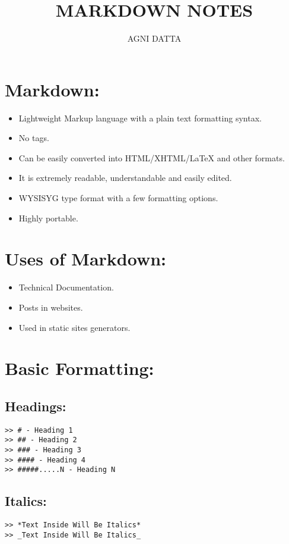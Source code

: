 \documentclass[british]{article}
\begin{document}
\title{\textbf{MARKDOWN NOTES}}
\author{AGNI DATTA}

\maketitle
{\small{}\tableofcontents{}}{\small\par}

\pagebreak{}

\section{Markdown:}
\begin{itemize}
\item Lightweight Markup language with a plain text formatting syntax.
\item No tags. 
\item Can be easily converted into HTML/XHTML/\LaTeX\: and other formats.
\item It is extremely readable, understandable and easily edited.
\item WYSISYG type format with a few formatting options.
\item Highly portable.
\end{itemize}

\section{Uses of Markdown:}
\begin{itemize}
\item Technical Documentation.
\item Posts in websites.
\item Used in static sites generators.
\end{itemize}

\section{Basic Formatting:}

\subsection{Headings:}
\begin{verbatim}
>> # - Heading 1
>> ## - Heading 2
>> ### - Heading 3
>> #### - Heading 4
>> #####.....N - Heading N
\end{verbatim}

\subsection{Italics:}
\begin{verbatim}
>> *Text Inside Will Be Italics*
>> _Text Inside Will Be Italics_
\end{verbatim}
\end{document}
